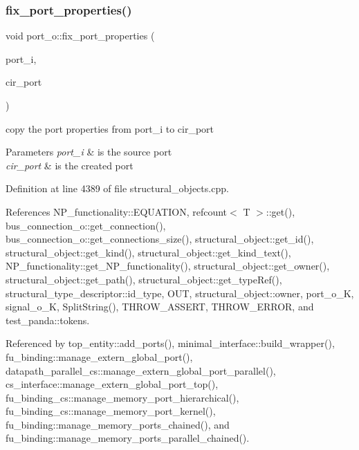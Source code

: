 \subsubsection{\texorpdfstring{fix\+\_\+port\+\_\+properties()}{fix\_port\_properties()}}
{\footnotesize\ttfamily void port\+\_\+o\+::fix\+\_\+port\+\_\+properties (\begin{DoxyParamCaption}\item[{\hyperlink{structural__objects_8hpp_a8ea5f8cc50ab8f4c31e2751074ff60b2}{structural\+\_\+object\+Ref}}]{port\+\_\+i,  }\item[{\hyperlink{structural__objects_8hpp_a8ea5f8cc50ab8f4c31e2751074ff60b2}{structural\+\_\+object\+Ref}}]{cir\+\_\+port }\end{DoxyParamCaption})\hspace{0.3cm}{\ttfamily [static]}}



copy the port properties from port\+\_\+i to cir\+\_\+port 


\begin{DoxyParams}{Parameters}
{\em port\+\_\+i} & is the source port \\
\hline
{\em cir\+\_\+port} & is the created port \\
\hline
\end{DoxyParams}


Definition at line 4389 of file structural\+\_\+objects.\+cpp.



References N\+P\+\_\+functionality\+::\+E\+Q\+U\+A\+T\+I\+ON, refcount$<$ T $>$\+::get(), bus\+\_\+connection\+\_\+o\+::get\+\_\+connection(), bus\+\_\+connection\+\_\+o\+::get\+\_\+connections\+\_\+size(), structural\+\_\+object\+::get\+\_\+id(), structural\+\_\+object\+::get\+\_\+kind(), structural\+\_\+object\+::get\+\_\+kind\+\_\+text(), N\+P\+\_\+functionality\+::get\+\_\+\+N\+P\+\_\+functionality(), structural\+\_\+object\+::get\+\_\+owner(), structural\+\_\+object\+::get\+\_\+path(), structural\+\_\+object\+::get\+\_\+type\+Ref(), structural\+\_\+type\+\_\+descriptor\+::id\+\_\+type, O\+UT, structural\+\_\+object\+::owner, port\+\_\+o\+\_\+K, signal\+\_\+o\+\_\+K, Split\+String(), T\+H\+R\+O\+W\+\_\+\+A\+S\+S\+E\+RT, T\+H\+R\+O\+W\+\_\+\+E\+R\+R\+OR, and test\+\_\+panda\+::tokens.



Referenced by top\+\_\+entity\+::add\+\_\+ports(), minimal\+\_\+interface\+::build\+\_\+wrapper(), fu\+\_\+binding\+::manage\+\_\+extern\+\_\+global\+\_\+port(), datapath\+\_\+parallel\+\_\+cs\+::manage\+\_\+extern\+\_\+global\+\_\+port\+\_\+parallel(), cs\+\_\+interface\+::manage\+\_\+extern\+\_\+global\+\_\+port\+\_\+top(), fu\+\_\+binding\+\_\+cs\+::manage\+\_\+memory\+\_\+port\+\_\+hierarchical(), fu\+\_\+binding\+\_\+cs\+::manage\+\_\+memory\+\_\+port\+\_\+kernel(), fu\+\_\+binding\+::manage\+\_\+memory\+\_\+ports\+\_\+chained(), and fu\+\_\+binding\+::manage\+\_\+memory\+\_\+ports\+\_\+parallel\+\_\+chained().


